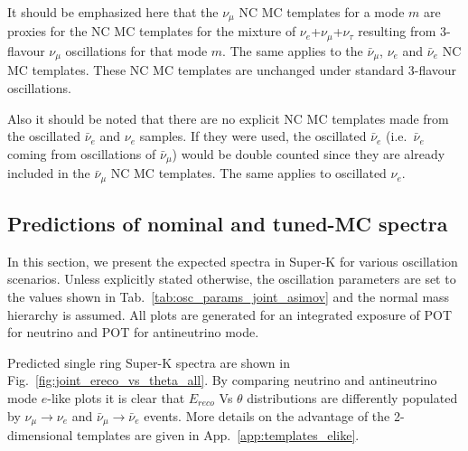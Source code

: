 It should be emphasized here that
the $\nu_{\mu}$ NC MC templates for a mode $m$ are proxies for the
NC MC templates for the mixture of $\nu_{e}$+$\nu_{\mu}$+$\nu_{\tau}$ resulting from
3-flavour $\nu_{\mu}$ oscillations for that mode $m$. The same applies to the $\bar{\nu}_{\mu}$, $\nu_{e}$ and $\bar{\nu}_{e}$ 
NC MC templates. These NC MC templates are unchanged under standard 3-flavour oscillations.%

Also it should be noted that there are no explicit NC MC templates made from the oscillated $\bar{\nu}_{e}$ and $\nu_{e}$ 
samples. If they were used, the oscillated $\bar{\nu}_{e}$ (i.e.\ $\bar{\nu}_{e}$ coming from oscillations of $\bar{\nu}_{\mu}$) 
would be double counted since they are already included in the $\bar{\nu}_{\mu}$ NC MC templates. The same applies to oscillated 
$\nu_{e}$.


\subsection {Predictions of nominal and tuned-MC spectra}
\label{sec:nominal_and_tuned_predictions}

In this section, we present the expected spectra in Super-K for various oscillation scenarios. 
Unless explicitly stated otherwise, the oscillation 
parameters are set to the values shown in Tab.~\ref{tab:osc_params_joint_asimov} and the normal mass hierarchy is assumed.
All plots are generated for an integrated exposure of 
\TotalPotNu{} POT for neutrino and \TotalPotNuBar{} POT for antineutrino mode.


Predicted single ring Super-K spectra are shown in Fig.~\ref{fig:joint_ereco_vs_theta_all}. 
By comparing neutrino and antineutrino mode $e$-like plots it is clear that $E_{reco}$ Vs $\theta$ distributions are differently populated
by $\nu_{\mu} \rightarrow \nu_e$ and $\bar{\nu}_{\mu} \rightarrow \bar{\nu}_e$ events.
More details on the advantage of the 2-dimensional templates are given in App.~\ref{app:templates_elike}.


